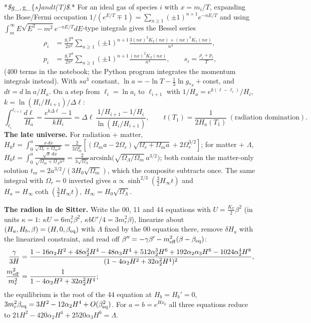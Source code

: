 \documentclass[10pt,a4paper]{article}
\begin{document}
*\emph{\$g\_}$, $g\_\{\emph{s\}$ and $t(T)\$.}* For an ideal gas of species $i$ with $x=m_i/T$, expanding the Bose/Fermi occupation $1/(e^{E/T}\mp1)=\sum_{n\ge1}(\pm1)^{n+1}e^{-nE/T}$ and using $\int_m^\infty E\sqrt{E^2-m^2}e^{-nE/T}dE$-type integrals gives the Bessel series
\begin{align*}
\rho_i&=\frac{g_iT^4}{2\pi^2}\sum_{n\ge1}(\pm1)^{n+1}\frac{3(nx)^2K_2(nx)+(nx)^3K_1(nx)}{n^4}, \\
p_i&=\frac{g_iT^4}{2\pi^2}\sum_{n\ge1}(\pm1)^{n+1}\frac{(nx)^2K_2(nx)}{n^4},\qquad s_i=\frac{\rho_i+p_i}T,
\end{align*}
(400 terms in the notebook; the Python program integrates the momentum integrals instead). With $sa^3$ constant, $\ln a=-\ln T-\tfrac13\ln g_{*s}+$const, and $dt=d\ln a/H_a$. On a step from $\ell_i=\ln a_i$ to $\ell_{i+1}$ with $1/H_a=e^{k(\ell-\ell_i)}/H_i$, $k=\ln(H_i/H_{i+1})/\Delta\ell$:
\begin{equation*}
\int_{\ell_i}^{\ell_{i+1}}\frac{d\ell}{H_a}=\frac{e^{k\Delta\ell}-1}{kH_i}=\Delta\ell\,\frac{1/H_{i+1}-1/H_i}{\ln(H_i/H_{i+1})},\qquad t(T_1)=\frac1{2H_a(T_1)}\ (\text{radiation domination}).
\end{equation*}
\textbf{The late universe.} For radiation + matter, $H_0t=\int_0^a\frac{x\,dx}{\sqrt{\Omega_r+\Omega_mx}}=\frac{2}{3\Omega_m^2}[(\Omega_ma-2\Omega_r)\sqrt{\Omega_r+\Omega_ma}+2\Omega_r^{3/2}]$; for matter + $\Lambda$, $H_0t=\int_0^a\frac{\sqrt x\,dx}{\sqrt{\Omega_m+\Omega_\Lambda x^3}}=\frac2{3\sqrt{\Omega_\Lambda}}\mathrm{arcsinh}\big(\sqrt{\Omega_\Lambda/\Omega_m}\,a^{3/2}\big)$; both contain the matter-only solution $t_m=2a^{3/2}/(3H_0\sqrt{\Omega_m})$, which the composite subtracts once. The same integral with $\Omega_r=0$ inverted gives $a\propto\sinh^{2/3}(\tfrac32H_\infty t)$ and $H_a=H_\infty\coth(\tfrac32H_\infty t)$, $H_\infty=H_0\sqrt{\Omega_\Lambda}$.

\textbf{The radion in de Sitter.} Write the 00, 11 and 44 equations with $U=\tfrac{K_U}2\beta^2$ (in units $\kappa=1$: $\kappa U=6m_r^2\beta^2$, $\kappa bU'/4=3m_r^2\beta$), linearize about $(H_a,H_b,\beta)=(H,0,\beta_{\rm eq})$ with $\Lambda$ fixed by the 00 equation there, remove $\delta H_a$ with the linearized constraint, and read off $\beta''=-\gamma\beta'-m_{\rm eff}^2(\beta-\beta_{\rm eq})$:
\begin{align*}
\frac{\gamma}{3H}&=\frac{1-16\alpha_2H^2+48\alpha_2^2H^4-48\alpha_3H^4+512\alpha_2^3H^6+192\alpha_2\alpha_3H^6-1024\alpha_2^4H^8}{(1-4\alpha_2H^2+32\alpha_2^2H^4)^2}, \\
\frac{m_{\rm eff}^2}{m_r^2}&=\frac1{1-4\alpha_2H^2+32\alpha_2^2H^4};
\end{align*}
the equilibrium is the root of the 44 equation at $H_b=H_b'=0$, $3m_r^2\beta_{\rm eq}=3H^2-12\alpha_2H^4+O(\beta_{\rm eq}^2)$. For $a=b=e^{Hx_0}$ all three equations reduce to $21H^2-420\alpha_2H^4+2520\alpha_3H^6=\Lambda$.
\end{document}
